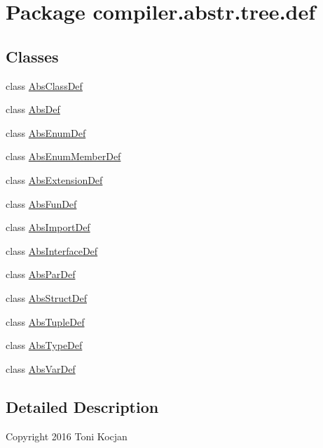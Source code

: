 \hypertarget{namespacecompiler_1_1abstr_1_1tree_1_1def}{}\section{Package compiler.\+abstr.\+tree.\+def}
\label{namespacecompiler_1_1abstr_1_1tree_1_1def}
\subsection*{Classes}
\begin{DoxyCompactItemize}
\item 
class \hyperlink{classcompiler_1_1abstr_1_1tree_1_1def_1_1_abs_class_def}{Abs\+Class\+Def}
\item 
class \hyperlink{classcompiler_1_1abstr_1_1tree_1_1def_1_1_abs_def}{Abs\+Def}
\item 
class \hyperlink{classcompiler_1_1abstr_1_1tree_1_1def_1_1_abs_enum_def}{Abs\+Enum\+Def}
\item 
class \hyperlink{classcompiler_1_1abstr_1_1tree_1_1def_1_1_abs_enum_member_def}{Abs\+Enum\+Member\+Def}
\item 
class \hyperlink{classcompiler_1_1abstr_1_1tree_1_1def_1_1_abs_extension_def}{Abs\+Extension\+Def}
\item 
class \hyperlink{classcompiler_1_1abstr_1_1tree_1_1def_1_1_abs_fun_def}{Abs\+Fun\+Def}
\item 
class \hyperlink{classcompiler_1_1abstr_1_1tree_1_1def_1_1_abs_import_def}{Abs\+Import\+Def}
\item 
class \hyperlink{classcompiler_1_1abstr_1_1tree_1_1def_1_1_abs_interface_def}{Abs\+Interface\+Def}
\item 
class \hyperlink{classcompiler_1_1abstr_1_1tree_1_1def_1_1_abs_par_def}{Abs\+Par\+Def}
\item 
class \hyperlink{classcompiler_1_1abstr_1_1tree_1_1def_1_1_abs_struct_def}{Abs\+Struct\+Def}
\item 
class \hyperlink{classcompiler_1_1abstr_1_1tree_1_1def_1_1_abs_tuple_def}{Abs\+Tuple\+Def}
\item 
class \hyperlink{classcompiler_1_1abstr_1_1tree_1_1def_1_1_abs_type_def}{Abs\+Type\+Def}
\item 
class \hyperlink{classcompiler_1_1abstr_1_1tree_1_1def_1_1_abs_var_def}{Abs\+Var\+Def}
\end{DoxyCompactItemize}


\subsection{Detailed Description}
Copyright 2016 Toni Kocjan


